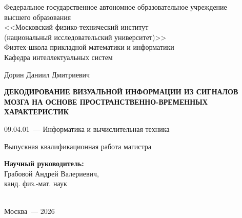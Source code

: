 \thispagestyle{empty}

\begin{titlepage}
%
\begin{center}
Федеральное государственное автономное образовательное учреждение\\ высшего образования\\
<<Московский физико-технический институт\\
(национальный исследовательский университет)>>\\
Физтех-школа прикладной математики и информатики\\
Кафедра интеллектуальных систем
\end{center}
%
\vspace{0pt plus5fill}
%
\begin{center}
\large{Дорин Даниил Дмитриевич}
\end{center}
%
\vspace{0pt}
%
\begin{center}
\textbf{\large\MakeUppercase{Декодирование визуальной информации из сигналов мозга на основе пространственно-временных характеристик}}
\end{center}
%
\vspace{0pt}
%
\begin{center}
09.04.01~--- Информатика и вычислительная техника
\end{center}
%
\vspace{0pt}
%
\begin{center}
Выпускная квалификационная работа магистра
\end{center}
%
\vspace{0pt plus2fill}
%
\begin{center}
\hfill\parbox{8,4cm}{\textbf{Научный руководитель:}\\
Грабовой Андрей Валериевич,\\
канд. физ.-мат. наук}\\
\vspace{0pt plus4fill}
Москва~--- 2026
\end{center}
%
\end{titlepage}